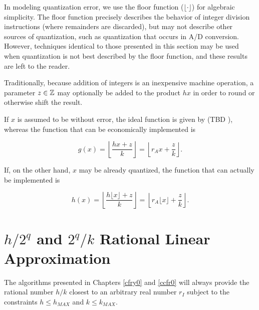 In modeling quantization error, we use the floor function
($\lfloor\cdot\rfloor$)
for algebraic simplicity.  The floor function precisely 
describes the behavior of integer division instructions (where 
remainders are discarded), but may not describe other sources of 
quantization, such as quantization that occurs in A/D conversion.
However, techniques identical to those presented in this
section may be used when quantization is not best described 
by the floor function, and these results are left to the reader.

Traditionally, because addition of integers is an inexpensive
machine operation, a parameter $z \in {\mathbb{Z}}$ may optionally 
be added to the product $hx$ in order to round or otherwise
shift the result.

If $x$ is assumed to be without error, the ideal function is
given by (TBD%
), whereas the function
that can be economically implemented is

\begin{equation}
\label{eq:crat0:srla0:smfu0:02}
g(x) = \left\lfloor \frac{hx + z}{k} \right\rfloor
=
\left\lfloor r_A x + \frac{z}{k} \right\rfloor .
\end{equation}

If, on the other hand, $x$ may be already quantized,
the function that can actually be implemented is

\begin{equation}
\label{eq:crat0:srla0:smfu0:03}
h(x) = \left\lfloor \frac{h \lfloor x \rfloor + z}{k} \right\rfloor
=
\left\lfloor r_A \lfloor x \rfloor + \frac{z}{k} \right\rfloor .
\end{equation}



\section[\protect\mbox{\protect$h/2^q$} and  \protect\mbox{\protect$2^q/k$} Rational Linear Approximation]
        {\protect\mbox{\protect\boldmath$h/2^q$} and \protect\mbox{\protect\boldmath$2^q/k$} Rational Linear Approximation}
\label{crat0:shqq0}

The algorithms presented in
Chapters \ref{cfry0} and \ref{ccfr0}
will always provide the rational number $h/k$ closest to
an arbitrary real number $r_I$ subject to the constraints
$h \leq h_{MAX}$ and $k \leq k_{MAX}$.

